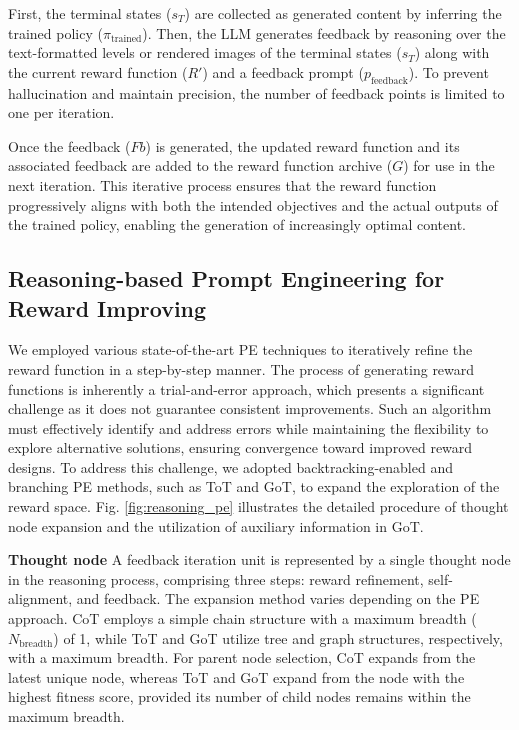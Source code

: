 First, the terminal states (\( s_T \)) are collected as generated content by inferring the trained policy (\( \pi_{\text{trained}} \)). Then, the LLM generates feedback by reasoning over the text-formatted levels or rendered images of the terminal states (\( s_T \)) along with the current reward function (\( R' \)) and a feedback prompt (\( p_{\text{feedback}} \)). To prevent hallucination and maintain precision, the number of feedback points is limited to one per iteration.

Once the feedback ($Fb$) is generated, the updated reward function and its associated feedback are added to the reward function archive (\( G \)) for use in the next iteration. This iterative process ensures that the reward function progressively aligns with both the intended objectives and the actual outputs of the trained policy, enabling the generation of increasingly optimal content.

\subsection{Reasoning-based Prompt Engineering for Reward Improving}
\label{sec:reasoning_pe}

We employed various state-of-the-art PE techniques to iteratively refine the reward function in a step-by-step manner. The process of generating reward functions is inherently a trial-and-error approach, which presents a significant challenge as it does not guarantee consistent improvements. 
Such an algorithm must effectively identify and address errors while maintaining the flexibility to explore alternative solutions, ensuring convergence toward improved reward designs.
To address this challenge, we adopted backtracking-enabled and branching PE methods, such as ToT and GoT, to expand the exploration of the reward space.
Fig. \ref{fig:reasoning_pe} illustrates the detailed procedure of thought node expansion and the utilization of auxiliary information in GoT.

\textbf{Thought node}
A feedback iteration unit is represented by a single thought node in the reasoning process, comprising three steps: reward refinement, self-alignment, and feedback. The expansion method varies depending on the PE approach. CoT employs a simple chain structure with a maximum breadth (\( N_{\text{breadth}} \)) of 1, while ToT and GoT utilize tree and graph structures, respectively, with a maximum breadth. For parent node selection, CoT expands from the latest unique node, whereas ToT and GoT expand from the node with the highest fitness score, provided its number of child nodes remains within the maximum breadth.


